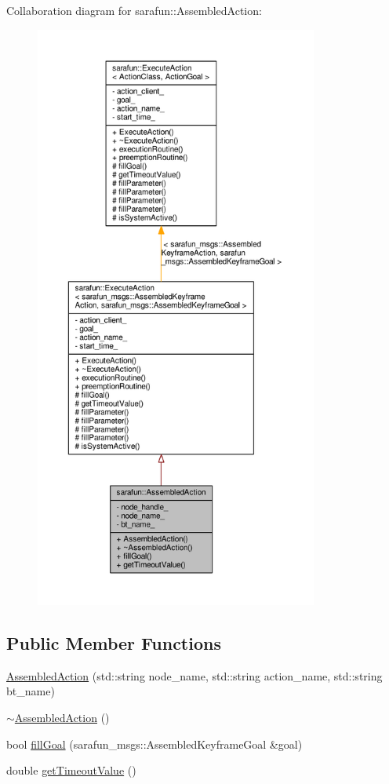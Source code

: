 Collaboration diagram for sarafun\-:\-:Assembled\-Action\-:\nopagebreak
\begin{figure}[H]
\begin{center}
\leavevmode
\includegraphics[height=550pt]{d7/df2/classsarafun_1_1AssembledAction__coll__graph}
\end{center}
\end{figure}
\subsection*{Public Member Functions}
\begin{DoxyCompactItemize}
\item 
\hyperlink{classsarafun_1_1AssembledAction_a0207a1b903e0189627087d7ed71bc130_a0207a1b903e0189627087d7ed71bc130}{Assembled\-Action} (std\-::string node\-\_\-name, std\-::string action\-\_\-name, std\-::string bt\-\_\-name)
\item 
\hyperlink{classsarafun_1_1AssembledAction_a8d290f1548b55bca1995df599272fc2f_a8d290f1548b55bca1995df599272fc2f}{$\sim$\-Assembled\-Action} ()
\item 
bool \hyperlink{classsarafun_1_1AssembledAction_a094a5cfde4d6bb6d024256834e771a39_a094a5cfde4d6bb6d024256834e771a39}{fill\-Goal} (sarafun\-\_\-msgs\-::\-Assembled\-Keyframe\-Goal \&goal)
\item 
double \hyperlink{classsarafun_1_1AssembledAction_ade9095a291dce652339238d137419b49_ade9095a291dce652339238d137419b49}{get\-Timeout\-Value} ()
\end{DoxyCompactItemize}
